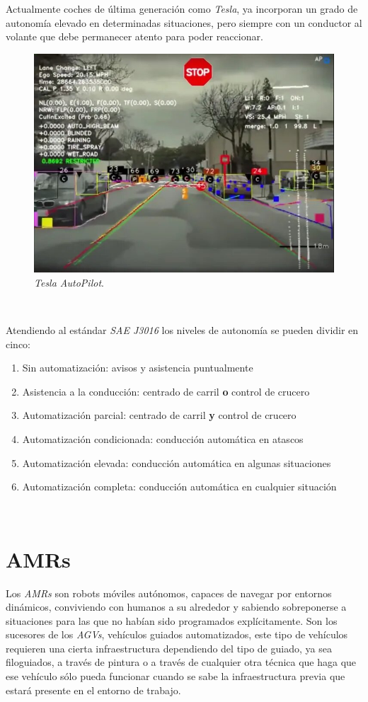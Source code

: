 Actualmente coches de última generación como \textit{Tesla}, ya incorporan un grado de autonomía elevado en determinadas situaciones, pero siempre con un conductor al volante que debe permanecer atento para poder reaccionar.\\

\begin{figure} [h!]
	\begin{center}
		\includegraphics[width=12cm]{figs/teslaobjectdetection}
	\end{center}
	\caption{\textit{Tesla AutoPilot}.}
	\label{fig:teslaobjectdetection}
\end{figure}\

Atendiendo al estándar \textit{SAE J3016} los niveles de autonomía se pueden dividir en cinco:

\begin{enumerate}
	\item Sin automatización: avisos y asistencia puntualmente
	\item Asistencia a la conducción: centrado de carril \textbf{o} control de crucero
	\item Automatización parcial: centrado de carril \textbf{y} control de crucero
	\item Automatización condicionada: conducción automática en atascos
	\item Automatización elevada: conducción automática en algunas situaciones
	\item Automatización completa: conducción automática en cualquier situación
\end{enumerate}\
\cite{saej3016}

\section{AMRs}
\label{sec:amr}
Los  \textit{AMRs} son robots móviles autónomos, capaces de navegar por entornos dinámicos, conviviendo con humanos a su alrededor y sabiendo sobreponerse a situaciones para las que no habían sido programados explícitamente. Son los sucesores de los  \textit{AGVs}, vehículos guiados automatizados, este tipo de vehículos requieren una cierta infraestructura dependiendo del tipo de guiado, ya sea filoguiados, a través de pintura o a través de cualquier otra técnica que haga que ese vehículo sólo pueda funcionar cuando se sabe la infraestructura previa que estará presente en el entorno de trabajo.\\

